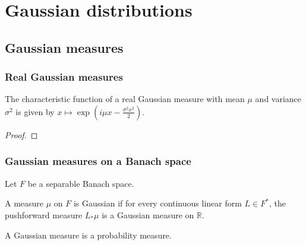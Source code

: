 \chapter{Gaussian distributions}
\label{chap:gaussian}

\section{Gaussian measures}
\label{sec:gaussian_measures}

\subsection{Real Gaussian measures}

\begin{definition}\label{def:gaussianReal}
  \mathlibok
\end{definition}


\begin{lemma}\label{lem:charFun_gaussianReal}
  \mathlibok
The characteristic function of a real Gaussian measure with mean $\mu$ and variance $\sigma^2$ is given by
$x \mapsto \exp\left(i \mu x - \frac{\sigma^2 x^2}{2}\right)$.
\end{lemma}

\begin{proof}\leanok

\end{proof}


\subsection{Gaussian measures on a Banach space}

Let $F$ be a separable Banach space.

\begin{definition}\label{def:IsGaussian}
A measure $\mu$ on $F$ is Gaussian if for every continuous linear form $L \in F^*$, the pushforward measure $L_* \mu$ is a Gaussian measure on $\mathbb{R}$.
\end{definition}


\begin{lemma}\label{lem:IsGaussian.IsProbabilityMeasure}
A Gaussian measure is a probability measure.
\end{lemma}


